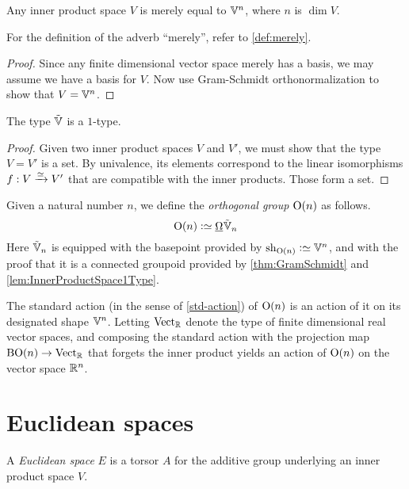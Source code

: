 \begin{theorem}\label{thm:GramSchmidt}
  Any inner product space $V$ is merely equal to $\mathbb V^n$, where $n$ is $\dim V$.
\end{theorem}

For the definition of the adverb ``merely'', refer to \cref{def:merely}.

\begin{proof}
  Since any finite dimensional vector space merely has a basis, we may assume
  we have a basis for $V$.  Now use Gram-Schmidt orthonormalization to show
  that $V = \mathbb V^n$.
\end{proof}

\begin{lemma}\label{lem:InnerProductSpace1Type}
  The type ${\tilde {\mathbb V}}$ is a $1$-type.
\end{lemma}

\begin{proof}
  Given two inner product spaces $V$ and $V'$, we must show that the type
  $V=V'$ is a set.  By univalence, its elements correspond to the linear
  isomorphisms $f : V \xrightarrow {\simeq} V'$ that are compatible with the
  inner products.  Those form a set.
\end{proof}

\begin{definition}\label{def:OrthogonalGroup}
  Given a natural number $n$, we define the {\em orthogonal group} $\mathrm{O}(n)$
  as follows.
  $$\OrthGp n \defeq \mkgroup \OS_n$$
  Here ${\tilde {\mathbb V}}_n$ is equipped with the basepoint provided by $\sh_{\OrthGp n} \defeq \VV^n$, and with the
  proof that it is a connected groupoid provided by \cref{thm:GramSchmidt} and
  \cref{lem:InnerProductSpace1Type}.
\end{definition}

The standard action (in the sense of \cref{std-action}) of $\mathrm{O}(n)$ is an
action of it on its designated shape $\mathbb V^n$.  Letting $\mathrm{Vect}_{\mathbb{R}}$ denote
the type of finite dimensional real vector spaces, and composing the standard
action with the projection map $\mathrm{B} \mathrm{O}(n) \to \mathrm{Vect}_{\mathbb{R}}$ that
forgets the inner product yields an action of $\mathrm{O}(n)$ on the vector space
$\mathbb{R}^n$.
  
\section{Euclidean spaces}

\begin{definition}\label{def:EuclideanSpace}
  A {\em Euclidean space} $E$ is a torsor $A$ for the additive group
  underlying an inner product space $V$.
\end{definition}

